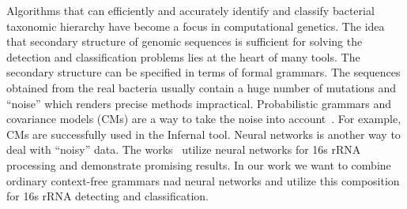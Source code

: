 \documentclass[a0paper,portrait]{baposter}
\begin{document}
\begin{poster}
{Algorithms that can efficiently and accurately identify and classify bacterial taxonomic hierarchy have become a focus in computational genetics.
The idea that secondary structure of genomic sequences is sufficient for solving the detection and classification problems lies at the heart of many tools.%
The secondary structure can be specified in terms of formal grammars. 
The sequences obtained from the real bacteria usually contain a huge number of mutations and ``noise'' which renders precise methods impractical. 
Probabilistic grammars and covariance models (CMs) are a way to take the noise into account~\cite{EddyDurbin}.
For example, CMs are successfully used in the Infernal tool. %
Neural networks is another way to deal with ``noisy'' data. 
The works~\cite{Humidor, ANN} utilize neural networks for 16s rRNA processing and demonstrate promising results.
In our work we want to combine ordinary context-free grammars nad neural networks and utilize this composition for 16s rRNA detecting and classification.
}

    
\end{poster}
\end{document}
